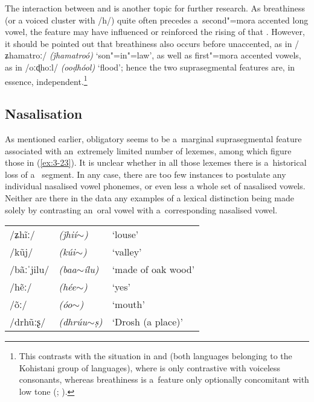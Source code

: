 The interaction between  and  is another topic for further research. As breathiness (or a voiced cluster with /h/) quite often precedes a~second"=mora accented long vowel, the feature may have influenced or reinforced the rising  of that . However, it should be pointed out that breathiness also occurs before unaccented, as in /ʑhamatroː/ \textit{(ǰhamatroó)} `son"=in"=law', as well as first"=mora accented vowels, as in /oːɖhoːl/ \textit{(ooḍhóol)} `flood'; hence the two suprasegmental features are, in essence, independent.\footnote{This contrasts with the situation in \iliGawri and \iliTorwali (both languages belonging to the Kohistani group of \iliHKIA languages), where  is only contrastive with voiceless consonants, whereas breathiness is a~feature only optionally concomitant with low tone (\citealt[92]{baart1999b}; \citealt[36--37]{lunsford2001}). } 


\subsection{Nasalisation}
\label{subsec:3-4-2}


As mentioned earlier, obligatory  seems to be a~marginal suprasegmental feature associated with an~extremely limited number of lexemes, among which figure those in (\ref{ex:3-23}). It is unclear whether in all those lexemes there is a~historical loss of a~ segment. In any case, there are too few instances to postulate any individual nasalised vowel phonemes, or even less a whole set of nasalised vowels. Neither are there in the data any examples of a lexical distinction being made solely by contrasting an~oral vowel with a~corresponding nasalised vowel. 


\begin{exe}
\extab
\label{ex:3-23}
\begin{tabularx}{\textwidth}{ l l l }
/ʑh\~{i}ː/ &
\textit{(ǰhií$\sim$) } &
`louse'\\
/kũj/ &
\textit{(kúi$\sim$)} &
`valley'\\
/bãːˈjilu/ &
\textit{(baa$\sim$ílu)} &
`made of oak wood'\\
/hẽː/ &
\textit{(hée$\sim$)} &
`yes'\\
/õː/ &
\textit{(óo$\sim$)} &
`mouth'\\
/drhũːʂ/ &
\textit{(dhrúu$\sim$ṣ)} &
`Drosh (a place)'\\
\end{tabularx}
\end{exe}

